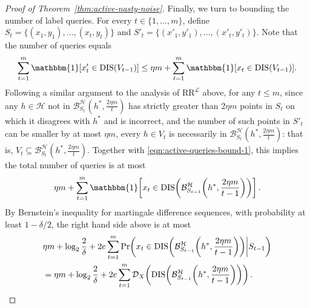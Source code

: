 \documentclass[11pt]{article}
\newcommand{\CR}{\text{RR}}
\newcommand{\0}{\mathbf{0}}
\newcommand{\1}{\mathbf{1}}
\newcommand{\cB}{\mathcal{B}}
\newcommand{\cD}{\mathcal{D}}
\newcommand{\cH}{\mathcal{H}}
\newcommand{\cL}{\mathcal{L}}
\begin{document}
\begin{proof}[Proof of Theorem~\ref{thm:active-nasty-noise}]
Finally, we turn to bounding the number of label queries.
For every $t \in \{1,\ldots,m\}$, define $S_t = \{(x_1,y_1),\ldots,(x_t,y_t)\}$
and $S'_t = \{(x'_1,y'_1),\ldots,(x'_t,y'_t)\}$.
Note that the number of queries equals
\begin{equation}
\label{eqn:active-queries-bound-1}
\sum_{t=1}^{m} \mathbbm{1}[ x'_t \in \text{DIS}(V_{t-1}) ]
\leq \eta m + \sum_{t=1}^{m} \mathbbm{1}[ x_t \in \text{DIS}(V_{t-1}) ].
\end{equation}
Following a similar argument to the analysis of
$\CR^{\cL}$ above, for any $t \leq m$,
since any $h \in \cH$ not in $\cB_{S_t}^\cH\!\left(h^*,\frac{2 \eta m}{t}\right)$
has strictly greater than $2\eta m$ points in $S_{t}$
on which it disagrees with $h^*$ and is incorrect,
and the number of such points in $S'_{t}$ can be smaller by
at most $\eta m$,
every $h \in V_{t}$ is necessarily in $\cB_{S_t}^\cH\!\left(h^*,\frac{2\eta m}{t}\right)$:
that is,
$V_{t} \subseteq \cB_{S_t}^\cH\!\left(h^*,\frac{2\eta m}{t}\right)$.
Together with \eqref{eqn:active-queries-bound-1},
this implies the total number of queries is at most
\begin{equation*}
\eta m + \sum_{t=1}^{m} \mathbbm{1}\!\left[ x_t \in \text{DIS}\!\left(\cB_{S_{t-1}}^\cH\!\left(h^*,\frac{2\eta m}{t-1}\right)\right) \right].
\end{equation*}
By Bernstein's inequality for martingale difference sequences,
with probability at least $1-\delta/2$, the right hand side
above is at most
\begin{align}
& \eta m + \log_{2}\frac{2}{\delta} + 2e \sum_{t=1}^{m} \text{Pr}\!\left( x_t \in \text{DIS}\!\left(\cB_{S_{t-1}}^\cH\!\left(h^*,\frac{2\eta m}{t-1}\right)\right) \middle| S_{t-1} \right)
\notag \\ & = \eta m + \log_{2}\frac{2}{\delta} + 2e \sum_{t=1}^{m} \cD_{X}\!\left( \text{DIS}\!\left(\cB_{S_{t-1}}^\cH\!\left(h^*,\frac{2\eta m}{t-1}\right)\right) \right).
\label{eqn:active-queries-bound-2}
\end{align}


\end{proof}
\end{document}
